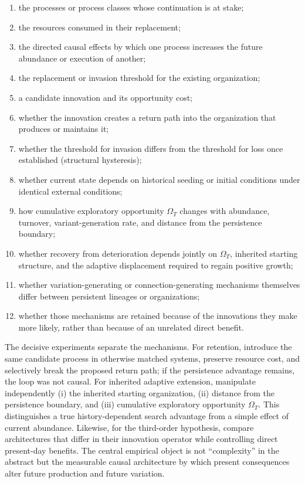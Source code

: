 \documentclass[11pt]{article}
\providecommand{\tightlist}{\setlength{\itemsep}{0pt}\setlength{\parskip}{0pt}}
\begin{document}
\begin{enumerate}
\def\labelenumi{\alph{enumi})}
\tightlist
\item
  the processes or process classes whose continuation is at stake;
\item
  the resources consumed in their replacement;
\item
  the directed causal effects by which one process increases the future
  abundance or execution of another;
\item
  the replacement or invasion threshold for the existing organization;
\item
  a candidate innovation and its opportunity cost;
\item
  whether the innovation creates a return path into the organization
  that produces or maintains it;
\item
  whether the threshold for invasion differs from the threshold for loss
  once established (structural hysteresis);
\item
  whether current state depends on historical seeding or initial
  conditions under identical external conditions;
\item
  how cumulative exploratory opportunity \(\Omega_T\) changes with
  abundance, turnover, variant-generation rate, and distance from the
  persistence boundary;
\item
  whether recovery from deterioration depends jointly on \(\Omega_T\),
  inherited starting structure, and the adaptive displacement required
  to regain positive growth;
\item
  whether variation-generating or connection-generating mechanisms
  themselves differ between persistent lineages or organizations;
\item
  whether those mechanisms are retained because of the innovations they
  make more likely, rather than because of an unrelated direct benefit.
\end{enumerate}

The decisive experiments separate the mechanisms. For retention,
introduce the same candidate process in otherwise matched systems,
preserve resource cost, and selectively break the proposed return path;
if the persistence advantage remains, the loop was not causal. For
inherited adaptive extension, manipulate independently (i) the inherited
starting organization, (ii) distance from the persistence boundary, and
(iii) cumulative exploratory opportunity \(\Omega_T\). This
distinguishes a true history-dependent search advantage from a simple
effect of current abundance. Likewise, for the third-order hypothesis,
compare architectures that differ in their innovation operator while
controlling direct present-day benefits. The central empirical object is
not ``complexity'' in the abstract but the measurable causal
architecture by which present consequences alter future production and
future variation.
\end{document}
